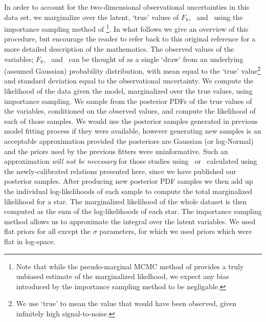 In order to account for the two-dimensional observational uncertainties in
this data set, we marginalize over the latent, `true' values of $F_8$,
\rhostar\ and \logg\ using the importance sampling method of
\citep{hogg:2010}\footnote{Note that while the pseudo-marginal MCMC method of
\citep{andrieu:2009} provides a truly unbiased estimate of the marginalized
likelhood, we expect any bias introduced by the importance sampling method to
be negligable.}.
In what follows we give an overview of this procedure, but encourage the reader
to refer back  to this original reference for a more detailed description of
the mathematics.
The observed values of the variables; $F_8$, \rhostar\ and \logg\ can be thought
of as a single `draw' from an underlying (assumed Gaussian) probability
distribution, with mean equal to the `true' value\footnote{We use `true' to
mean the value that would have been observed, given infinitely high
signal-to-noise.} and standard deviation equal to the observational
uncertainty.
We compute the likelihood of the data given the model, marginalized over the
true values, using importance sampling.
We sample from the posterior PDFs of the true values of the variables,
conditioned on the observed values, and compute the likelihood of each of those
samples.
We would use the posterior samples generated in previous model fitting process
if they were available, however generating new samples is an acceptable
approximation provided the posteriors are Gaussian (or log-Normal) and the
priors used by the previous fitters were uninformative.
Such an approximation {\it will not be necessary} for those studies using
\rhostar\ or \logg\ calculated using the newly-calibrated relations
presented here, since we have published our posterior samples.
After producing new posterior PDF samples we then add up the individual
log-likelihoods of each sample to compute the total marginalized likelihood
for a star.
The marginalized likelihood of the whole dataset is then computed as the sum
of the log-likelihoods of each star.
The importance sampling method allows us to approximate the integral over the
latent variables.
We used flat priors for all except the $\sigma$ parameters, for which we used
priors which were flat in log-space.

